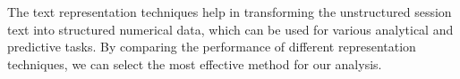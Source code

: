         The text representation techniques help in transforming the unstructured session text into structured numerical data, which can be used for various analytical and predictive tasks. By comparing the performance of different representation techniques, we can select the most effective method for our analysis.
